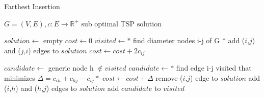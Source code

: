 \begin{algorithm}
    \caption{Farthest Insertion}\label{algo:extramileage}
    \begin{algorithmic}[1]
    \Require $G = (V,E), c:E \to \mathbb{R}^+$
    \Ensure $\text{sub optimal TSP solution}$

    \State $solution \gets$ empty
    \State $cost \gets 0$
    \State $visited \gets  *$ find diameter nodes i-j of G $*$
    \State add ($i$,$j$) and ($j$,$i$) edges to $solution$
    \State $cost \gets cost + 2 c_{ij}$
    


    \State $candidate \gets $ generic node h $ \notin visited$
    \State $candidate \gets *$ find edge i-j visited that minimizes $\Delta = c_{ih} + c_{hj} - c_{ij}*$
    \State $cost \gets cost + \Delta$
    \State remove ($i$,$j$) edge to $solution$
    \State add ($i$,$h$) and ($h$,$j$) edges to $solution$
    \State add $candidate$ to $visited$

    \EndWhile



    \end{algorithmic}
\end{algorithm}


